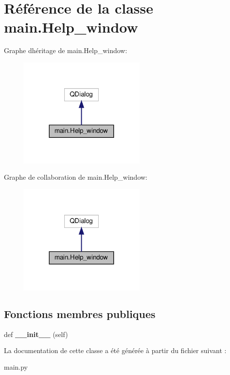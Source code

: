 \hypertarget{classmain_1_1Help__window}{}\section{Référence de la classe main.\+Help\+\_\+window}
\label{classmain_1_1Help__window}


Graphe d\textquotesingle{}héritage de main.\+Help\+\_\+window\+:
\nopagebreak
\begin{figure}[H]
\begin{center}
\leavevmode
\includegraphics[width=179pt]{classmain_1_1Help__window__inherit__graph}
\end{center}
\end{figure}


Graphe de collaboration de main.\+Help\+\_\+window\+:
\nopagebreak
\begin{figure}[H]
\begin{center}
\leavevmode
\includegraphics[width=179pt]{classmain_1_1Help__window__coll__graph}
\end{center}
\end{figure}
\subsection*{Fonctions membres publiques}
\begin{DoxyCompactItemize}
\item 
\mbox{\label{classmain_1_1Help__window_a1ed494c3053c64389179c2daa132ea8c}} 
def {\bfseries \+\_\+\+\_\+init\+\_\+\+\_\+} (self)
\end{DoxyCompactItemize}


La documentation de cette classe a été générée à partir du fichier suivant \+:\begin{DoxyCompactItemize}
\item 
main.\+py\end{DoxyCompactItemize}
